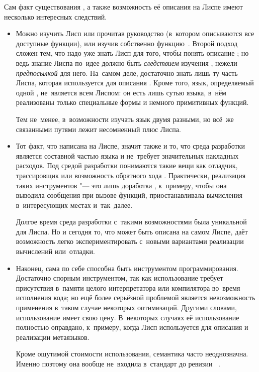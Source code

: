Сам факт существования , а также возможность её описания на Лиспе
имеют несколько интересных следствий.
\begin{itemize}
  \item Можно изучить Лисп или прочитав руководство (в~котором описываются
        все доступные функции), или изучив собственно функцию~.
        Второй подход сложен тем, что надо уже знать Лисп для того, чтобы
        понять описание ; но ведь знание Лиспа по~идее должно быть
        \emph{следствием} изучения , нежели \emph{предпосылкой} для
        него. На~самом деле, достаточно знать лишь ту часть Лиспа, которая
        используется для описания . Кроме того, язык, определяемый
        одной , не~является всем Лиспом: он есть лишь сутью языка,
        в~нём реализованы только специальные формы и немного примитивных
        функций.

        Тем не~менее, в~возможности изучать язык двумя разными, но всё~же
        связанными путями лежит несомненный плюс Лиспа.

  \item Тот факт, что  написана на Лиспе, значит также и то, что
        среда разработки является составной частью языка и не~требует
        значительных накладных расходов. Под средой разработки понимаются
        такие вещи как отладчик, трассировщик или возможность обратного
        хода \cite{lie87}. Практически, реализация таких инструментов "---
        это лишь доработка , к~примеру, чтобы она выводила
        сообщения при вызове функций, приостанавливала вычисления
        в~интересующих местах и~так~далее.

        Долгое время среда разработки с~такими возможностями была уникальной
        для Лиспа. Но и сегодня то, что  может быть описана на самом
        Лиспе, даёт возможность легко экспериментировать с~новыми вариантами
        реализации вычислений или~отладки.

  \item Наконец, сама по себе  способна быть инструментом
        программирования. Достаточно спорным инструментом, так как
        использование  требует присутствия в~памяти целого
        интерпретатора или компилятора во~время исполнения кода; но ещё
        более серьёзной проблемой является невозможность применения в~таком
        случае некоторых оптимизаций. Другими словами, использование
         имеет свою цену. В~некоторых случаях её использование
        полностью оправдано, к~примеру, когда Лисп используется для описания
        и реализации метаязыков.

        Кроме ощутимой стоимости использования, семантика  часто
        неоднозначна. Именно поэтому она вообще не~входила в~стандарт до
        ревизии \RnRS~\cite{cr91b,kcr98}. 
\end{itemize}


